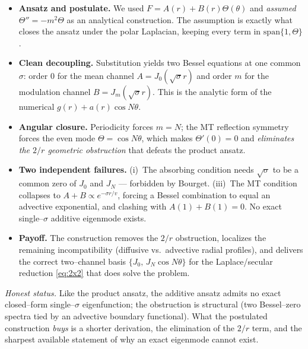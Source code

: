 \documentclass{article}
\begin{document}
\begin{itemize}
\item \textbf{Ansatz and postulate.} We used $F=A(r)+B(r)\Theta(\theta)$ and
\emph{assumed} $\Theta''=-m^2\Theta$ as an analytical construction. The
assumption is exactly what closes the ansatz under the polar Laplacian, keeping
every term in $\mathrm{span}\{1,\Theta\}$.
\item \textbf{Clean decoupling.} Substitution yields two Bessel equations at one
common $\sigma$: order $0$ for the mean channel $A=J_0(\sqrt\sigma r)$ and order
$m$ for the modulation channel $B=J_m(\sqrt\sigma r)$. This is the analytic form
of the numerical $g(r)+a(r)\cos N\theta$.
\item \textbf{Angular closure.} Periodicity forces $m=N$; the MT reflection
symmetry forces the even mode $\Theta=\cos N\theta$, which makes $\Theta'(0)=0$
and \emph{eliminates the $2/r$ geometric obstruction} that defeats the product
ansatz.
\item \textbf{Two independent failures.} (i)~The absorbing condition needs
$\sqrt\sigma$ to be a common zero of $J_0$ and $J_N$ --- forbidden by Bourget.
(iii)~The MT condition collapses to $A+B\propto e^{-\sigma r/v}$, forcing a
Bessel combination to equal an advective exponential, and clashing with
$A(1)+B(1)=0$. No exact single--$\sigma$ additive eigenmode exists.
\item \textbf{Payoff.} The construction removes the $2/r$ obstruction, localizes
the remaining incompatibility (diffusive vs.\ advective radial profiles), and
delivers the correct two--channel basis $\{J_0,\,J_N\cos N\theta\}$ for the
Laplace/secular reduction \eqref{eq:2x2} that does solve the problem.
\end{itemize}

\noindent\textit{Honest status.} Like the product ansatz, the additive ansatz
admits no exact closed--form single--$\sigma$ eigenfunction; the obstruction is
structural (two Bessel--zero spectra tied by an advective boundary functional).
What the postulated construction \emph{buys} is a shorter derivation, the
elimination of the $2/r$ term, and the sharpest available statement of why an
exact eigenmode cannot exist.
\end{document}
